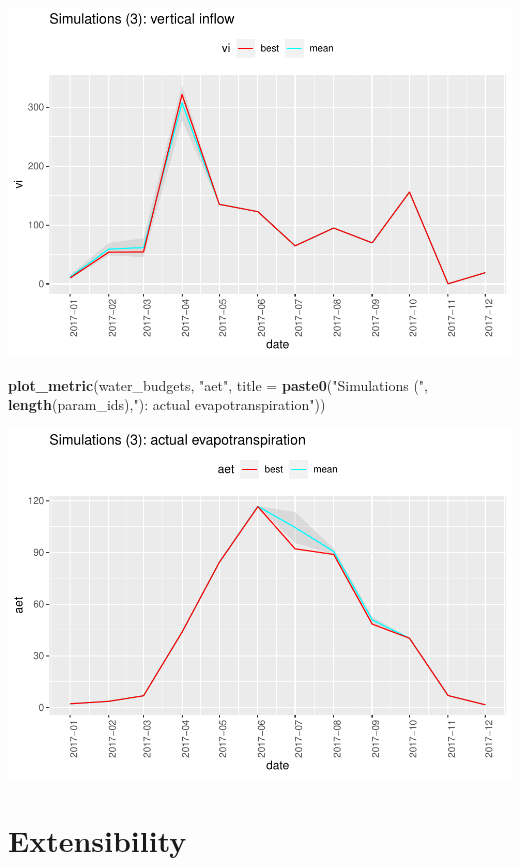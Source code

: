 \documentclass[
]{book}
\newenvironment{Shaded}{\begin{snugshade}}{\end{snugshade}}
\newcommand{\AttributeTok}[1]{\textcolor[rgb]{0.13,0.29,0.53}{#1}}
\newcommand{\FunctionTok}[1]{\textcolor[rgb]{0.13,0.29,0.53}{\textbf{#1}}}
\newcommand{\NormalTok}[1]{#1}
\newcommand{\StringTok}[1]{\textcolor[rgb]{0.31,0.60,0.02}{#1}}
\begin{document}
\includegraphics{fig/calib-uncert-vi-1.pdf}

\begin{Shaded}
\begin{Highlighting}[]
\FunctionTok{plot\_metric}\NormalTok{(water\_budgets, }\StringTok{"aet"}\NormalTok{, }
            \AttributeTok{title =} \FunctionTok{paste0}\NormalTok{(}\StringTok{"Simulations ("}\NormalTok{, }\FunctionTok{length}\NormalTok{(param\_ids),}\StringTok{"): actual evapotranspiration"}\NormalTok{))}
\end{Highlighting}
\end{Shaded}

\includegraphics{fig/calib-uncert-aet-1.pdf}

\hypertarget{extensibility}{%
\chapter{Extensibility}\label{extensibility}}
\end{document}
